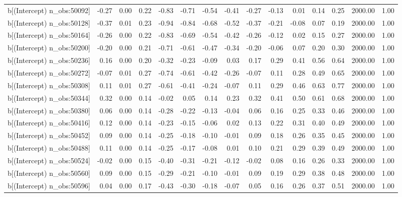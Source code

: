 \begin{table}[ht]
\begin{tabular}{rrrrrrrrrrrrrrr}
  b[(Intercept) n\_obs:50092] & -0.27 & 0.00 & 0.22 & -0.83 & -0.71 & -0.54 & -0.41 & -0.27 & -0.13 & 0.01 & 0.14 & 0.25 & 2000.00 & 1.00 \\ 
  b[(Intercept) n\_obs:50128] & -0.37 & 0.01 & 0.23 & -0.94 & -0.84 & -0.68 & -0.52 & -0.37 & -0.21 & -0.08 & 0.07 & 0.19 & 2000.00 & 1.00 \\ 
  b[(Intercept) n\_obs:50164] & -0.26 & 0.00 & 0.22 & -0.83 & -0.69 & -0.54 & -0.42 & -0.26 & -0.12 & 0.02 & 0.15 & 0.27 & 2000.00 & 1.00 \\ 
  b[(Intercept) n\_obs:50200] & -0.20 & 0.00 & 0.21 & -0.71 & -0.61 & -0.47 & -0.34 & -0.20 & -0.06 & 0.07 & 0.20 & 0.30 & 2000.00 & 1.00 \\ 
  b[(Intercept) n\_obs:50236] & 0.16 & 0.00 & 0.20 & -0.32 & -0.23 & -0.09 & 0.03 & 0.17 & 0.29 & 0.41 & 0.56 & 0.64 & 2000.00 & 1.00 \\ 
  b[(Intercept) n\_obs:50272] & -0.07 & 0.01 & 0.27 & -0.74 & -0.61 & -0.42 & -0.26 & -0.07 & 0.11 & 0.28 & 0.49 & 0.65 & 2000.00 & 1.00 \\ 
  b[(Intercept) n\_obs:50308] & 0.11 & 0.01 & 0.27 & -0.61 & -0.41 & -0.24 & -0.07 & 0.11 & 0.29 & 0.46 & 0.63 & 0.77 & 2000.00 & 1.00 \\ 
  b[(Intercept) n\_obs:50344] & 0.32 & 0.00 & 0.14 & -0.02 & 0.05 & 0.14 & 0.23 & 0.32 & 0.41 & 0.50 & 0.61 & 0.68 & 2000.00 & 1.00 \\ 
  b[(Intercept) n\_obs:50380] & 0.06 & 0.00 & 0.14 & -0.28 & -0.22 & -0.13 & -0.04 & 0.06 & 0.16 & 0.25 & 0.33 & 0.46 & 2000.00 & 1.00 \\ 
  b[(Intercept) n\_obs:50416] & 0.12 & 0.00 & 0.14 & -0.23 & -0.15 & -0.06 & 0.02 & 0.13 & 0.22 & 0.31 & 0.40 & 0.49 & 2000.00 & 1.00 \\ 
  b[(Intercept) n\_obs:50452] & 0.09 & 0.00 & 0.14 & -0.25 & -0.18 & -0.10 & -0.01 & 0.09 & 0.18 & 0.26 & 0.35 & 0.45 & 2000.00 & 1.00 \\ 
  b[(Intercept) n\_obs:50488] & 0.11 & 0.00 & 0.14 & -0.25 & -0.17 & -0.08 & 0.01 & 0.10 & 0.21 & 0.29 & 0.39 & 0.49 & 2000.00 & 1.00 \\ 
  b[(Intercept) n\_obs:50524] & -0.02 & 0.00 & 0.15 & -0.40 & -0.31 & -0.21 & -0.12 & -0.02 & 0.08 & 0.16 & 0.26 & 0.33 & 2000.00 & 1.00 \\ 
  b[(Intercept) n\_obs:50560] & 0.09 & 0.00 & 0.15 & -0.29 & -0.21 & -0.10 & -0.01 & 0.09 & 0.19 & 0.29 & 0.38 & 0.48 & 2000.00 & 1.00 \\ 
  b[(Intercept) n\_obs:50596] & 0.04 & 0.00 & 0.17 & -0.43 & -0.30 & -0.18 & -0.07 & 0.05 & 0.16 & 0.26 & 0.37 & 0.51 & 2000.00 & 1.00 \\ 

\end{tabular}
\end{table}
